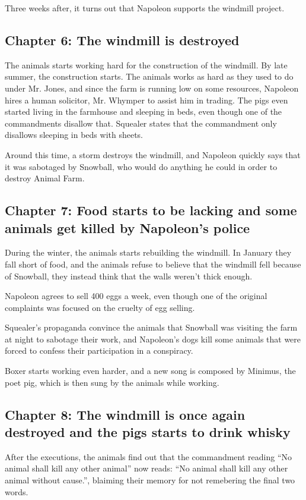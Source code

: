\documentclass{article}
\begin{document}
    Three weeks after, it turns out that Napoleon supports the windmill project.

    \subsection{Chapter 6: The windmill is destroyed}

    The animals starts working hard for the construction of the windmill. By late summer, the construction starts. The animals works as hard as they used to do under Mr. Jones, and since the farm is running low on some resources, Napoleon hires a human solicitor, Mr. Whymper to assist him in trading. The pigs even started living in the farmhouse and sleeping in beds, even though one of the commandments disallow that. Squealer states that the commandment only disallows sleeping in beds with sheets.

    Around this time, a storm destroys the windmill, and Napoleon quickly says that it was sabotaged by Snowball, who would do anything he could in order to destroy Animal Farm.

    \subsection{Chapter 7: Food starts to be lacking and some animals get killed by Napoleon's police}
    During the winter, the animals starts rebuilding the windmill. In January they fall short of food, and the animals refuse to believe that the windmill fell because of Snowball, they instead think that the walls weren't thick enough.

    Napoleon agrees to sell 400 eggs a week, even though one of the original complaints was focused on the cruelty of egg selling.

    Squealer's propaganda convince the animals that Snowball was visiting the farm at night to sabotage their work, and Napoleon's dogs kill some animals that were forced to confess their participation in a conspiracy.

    Boxer starts working even harder, and a new song is composed by Minimus, the poet pig, which is then sung by the animals while working.

    \subsection{Chapter 8: The windmill is once again destroyed and the pigs starts to drink whisky}
    After the executions, the animals find out that the commandment reading “No animal shall kill any other animal” now reads: “No animal shall kill any other animal without cause.”, blaiming their memory for not remebering the final two words.
\end{document}
